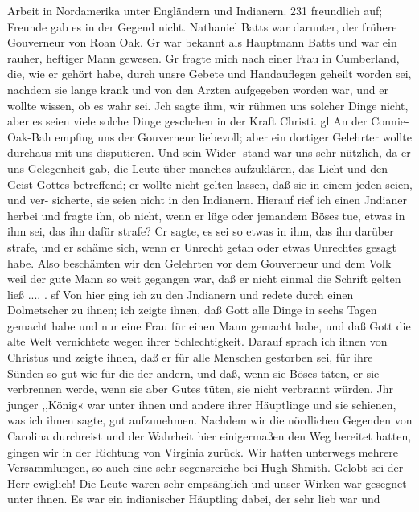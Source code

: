 Arbeit in Nordamerika unter Engländern und Indianern. 231
freundlich auf; Freunde gab es in der Gegend nicht. Nathaniel
Batts war darunter, der frühere Gouverneur von Roan Oak. Gr
war bekannt als Hauptmann Batts und war ein rauher, heftiger
Mann gewesen. Gr fragte mich nach einer Frau in Cumberland,
die, wie er gehört habe, durch unsre Gebete und Handauflegen
geheilt worden sei, nachdem sie lange krank und von den Arzten
aufgegeben worden war, und er wollte wissen, ob es wahr sei.
Jch sagte ihm, wir rühmen uns solcher Dinge nicht, aber es seien
viele solche Dinge geschehen in der Kraft Christi. gl An der Connie-
Oak-Bah empfing uns der Gouverneur liebevoll; aber ein dortiger
Gelehrter wollte durchaus mit uns disputieren. Und sein Wider-
stand war uns sehr nützlich, da er uns Gelegenheit gab, die Leute
über manches aufzuklären, das Licht und den Geist Gottes betreffend;
er wollte nicht gelten lassen, daß sie in einem jeden seien, und ver-
sicherte, sie seien nicht in den Indianern. Hierauf rief ich einen
Jndianer herbei und fragte ihn, ob nicht, wenn er lüge oder
jemandem Böses tue, etwas in ihm sei, das ihn dafür strafe? Cr
sagte, es sei so etwas in ihm, das ihn darüber strafe, und er
schäme sich, wenn er Unrecht getan oder etwas Unrechtes gesagt
habe. Also beschämten wir den Gelehrten vor dem Gouverneur
und dem Volk weil der gute Mann so weit gegangen war, daß er
nicht einmal die Schrift gelten ließ .... . sf
Von hier ging ich zu den Jndianern und redete durch einen
Dolmetscher zu ihnen; ich zeigte ihnen, daß Gott alle Dinge in
sechs Tagen gemacht habe und nur eine Frau für einen Mann
gemacht habe, und daß Gott die alte Welt vernichtete wegen ihrer
Schlechtigkeit. Darauf sprach ich ihnen von Christus und zeigte
ihnen, daß er für alle Menschen gestorben sei, für ihre Sünden
so gut wie für die der andern, und daß, wenn sie Böses täten, er sie
verbrennen werde, wenn sie aber Gutes tüten, sie nicht verbrannt
würden. Jhr junger ,,König« war unter ihnen und andere ihrer
Häuptlinge und sie schienen, was ich ihnen sagte, gut aufzunehmen.
Nachdem wir die nördlichen Gegenden von Carolina durchreist
und der Wahrheit hier einigermaßen den Weg bereitet hatten,
gingen wir in der Richtung von Virginia zurück. Wir hatten
unterwegs mehrere Versammlungen, so auch eine sehr segensreiche
bei Hugh Shmith. Gelobt sei der Herr ewiglich! Die Leute waren
sehr empsänglich und unser Wirken war gesegnet unter ihnen. Es
war ein indianischer Häuptling dabei, der sehr lieb war und


